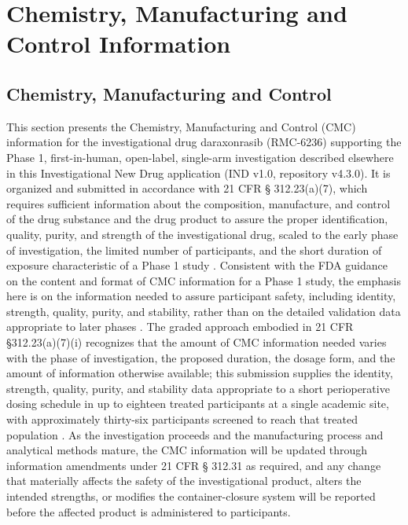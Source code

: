 \section{Chemistry, Manufacturing and Control Information}

\subsection{Chemistry, Manufacturing and Control}

This section presents the Chemistry, Manufacturing and Control (CMC)
information for the investigational drug daraxonrasib (RMC-6236) supporting the
Phase 1, first-in-human, open-label, single-arm investigation described
elsewhere in this Investigational New Drug application (IND v1.0, repository
v4.3.0). It is organized and submitted in accordance with 21 CFR \S
312.23(a)(7), which requires sufficient information about the composition,
manufacture, and control of the drug substance and the drug product to assure
the proper identification, quality, purity, and strength of the investigational
drug, scaled to the early phase of investigation, the limited number of
participants, and the short duration of exposure characteristic of a Phase 1
study \cite{phase1guidance}. Consistent with the FDA guidance on the content
and format of CMC information for a Phase 1 study, the emphasis here is on the
information needed to assure participant safety, including identity, strength,
quality, purity, and stability, rather than on the detailed validation data
appropriate to later phases \cite{phase1guidance}. The graded approach embodied
in 21 CFR \S 312.23(a)(7)(i) recognizes that the amount of CMC information
needed varies with the phase of investigation, the proposed duration, the dosage
form, and the amount of information otherwise available; this submission supplies
the identity, strength, quality, purity, and stability data appropriate to a
short perioperative dosing schedule in up to eighteen treated participants at a
single academic site, with approximately thirty-six participants screened to
reach that treated population \cite{phase1guidance}. As the investigation
proceeds and the manufacturing process and analytical methods mature, the CMC
information will be updated through information amendments under 21 CFR \S
312.31 as required, and any change that materially affects the safety of the
investigational product, alters the intended strengths, or modifies the
container-closure system will be reported before the affected product is
administered to participants.

